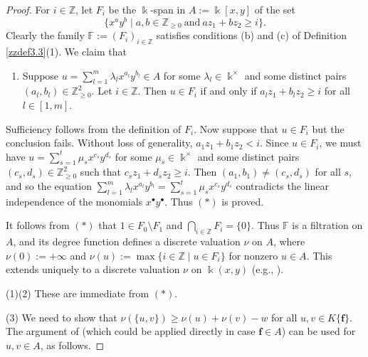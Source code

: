 \documentclass[12pt]{amsart}
\theoremstyle{plain}
\numberwithin{theorem}{section}
\numberwithin{equation}{theorem}
\theoremstyle{definition}
\newcommand{\FF}{\mathbb{F}}
\newcommand{\ZZ}{\mathbb{Z}}
\newcommand \bff {{\mathbf{f}}}
\newcommand \Znn {\ZZ_{\ge 0}}
\newcommand \kx {\Bbbk^\times}
\begin{document}
\begin{proof}
For $i \in \ZZ$, let $F_i$ be the $\Bbbk$-span in $A := \Bbbk[x,y]$ of the set
$$
\{ x^ay^b \mid a,b \in \Znn\ \text{and}\ az_1+bz_2 \ge i\}.
$$
Clearly the family $\FF := (F_i)_{i\in\ZZ}$ satisfies conditions (b) and (c) of Definition \ref{zzdef3.3}(1). We claim that
\begin{enumerate}
\item[($*$)]
Suppose $u = \sum_{l=1}^m \lambda_l x^{a_l} y^{b_l} \in A$ for some $\lambda_l \in \kx$ and some distinct pairs $(a_l,b_l) \in \Znn^2$.  Let $i \in \ZZ$.  Then $u \in F_i$ if and only if $a_lz_1+b_lz_2 \ge i$ for all $l \in [1,m]$.
\end{enumerate}
Sufficiency follows from the definition of $F_i$.  Now suppose that $u \in F_i$ but the conclusion fails.  Without loss of generality, $a_1z_1+b_1z_2 < i$.  Since $u \in F_i$, we must have $u = \sum_{s=1}^t \mu_s x^{c_s} y^{d_s}$ for some $\mu_s \in \kx$ and some distinct pairs $(c_s,d_s) \in \Znn^2$ such that $c_sz_1+d_sz_2 \ge i$.  Then $(a_1,b_1) \ne (c_s,d_s)$ for all $s$, and so the equation $\sum_{l=1}^m \lambda_l x^{a_l} y^{b_l} = \sum_{s=1}^t \mu_s x^{c_s} y^{d_s}$ contradicts the linear independence of the monomials $x^\bullet y^\bullet$.  Thus $(*)$ is proved.

It follows from $(*)$ that $1 \in F_0 \setminus F_1$ and $\bigcap_{i \in \ZZ} F_i = \{0\}$.  Thus $\FF$ is a filtration on $A$, and its degree function defines a discrete valuation $\nu$ on $A$, where $\nu(0) := +\infty$ and $\nu(u) := \max\{i \in \ZZ \mid u \in F_i\}$ for nonzero $u \in A$.  This extends uniquely to a discrete valuation $\nu$ on $\Bbbk(x,y)$ (e.g., \cite[Chapter VI, \S3, Proposition 4]{Bo}).

(1)(2) These are immediate from $(*)$.

(3) We need to show that $\nu(\{u,v\}) \ge \nu(u) + \nu(v) - w$ for all $u,v \in K\{\bff\}$.  The argument of \cite[Lemma 2.9(3)]{HTWZ1} (which could be applied directly in case $\bff \in A$) can be used for $u,v \in A$, as follows.


\end{proof}
\end{document}

